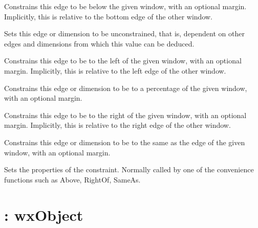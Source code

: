 Constrains this edge to be below the given window, with an
optional margin. Implicitly, this is relative to the bottom edge of the other window.



Sets this edge or dimension to be unconstrained, that is, dependent on
other edges and dimensions from which this value can be deduced.



Constrains this edge to be to the left of the given window, with an
optional margin. Implicitly, this is relative to the left edge of the other window.



Constrains this edge or dimension to be to a percentage of the given window, with an
optional margin.



Constrains this edge to be to the right of the given window, with an
optional margin. Implicitly, this is relative to the right edge of the other window.



Constrains this edge or dimension to be to the same as the edge of the given window, with an
optional margin.



Sets the properties of the constraint. Normally called by one of the convenience
functions such as Above, RightOf, SameAs.

\section{: wxObject}\label{wxintpoint}

